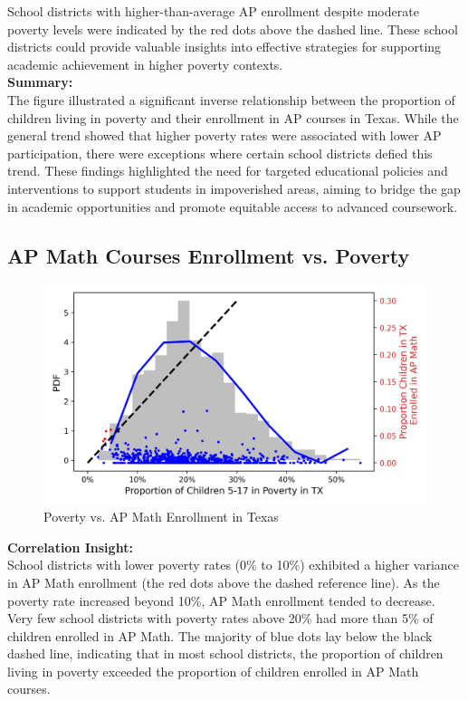 \documentclass[sn-mathphys-num]{sn-jnl}%
\theoremstyle{thmstyleone}%
\theoremstyle{thmstyletwo}%
\theoremstyle{thmstylethree}%
\begin{document}
{School districts with higher-than-average AP enrollment despite moderate poverty levels were indicated by the red dots above the dashed line. These school districts could provide valuable insights into effective strategies for supporting academic achievement in higher poverty contexts.\\

\textbf{Summary:}\\

The figure illustrated a significant inverse relationship between the proportion of children living in poverty and their enrollment in AP courses in Texas. While the general trend showed that higher poverty rates were associated with lower AP participation, there were exceptions where certain school districts defied this trend. These findings highlighted the need for targeted educational policies and interventions to support students in impoverished areas, aiming to bridge the gap in academic opportunities and promote equitable access to advanced coursework.\\

\subsection{AP Math Courses Enrollment vs. Poverty}

\begin{figure}[h]
    \centering
    \includegraphics[]{Poverty_vs_APMath_TX.png}
    \caption{Poverty vs. AP Math Enrollment in Texas}
    \label{fig:APMath}
\end{figure}

\textbf{Correlation Insight:}\\

School districts with lower poverty rates (0\% to 10\%) exhibited a higher variance in AP Math enrollment (the red dots above the dashed reference line). As the poverty rate increased beyond 10\%, AP Math enrollment tended to decrease. Very few school districts with poverty rates above 20\% had more than 5\% of children enrolled in AP Math. The majority of blue dots lay below the black dashed line, indicating that in most school districts, the proportion of children living in poverty exceeded the proportion of children enrolled in AP Math courses.\\

}
\end{document}
